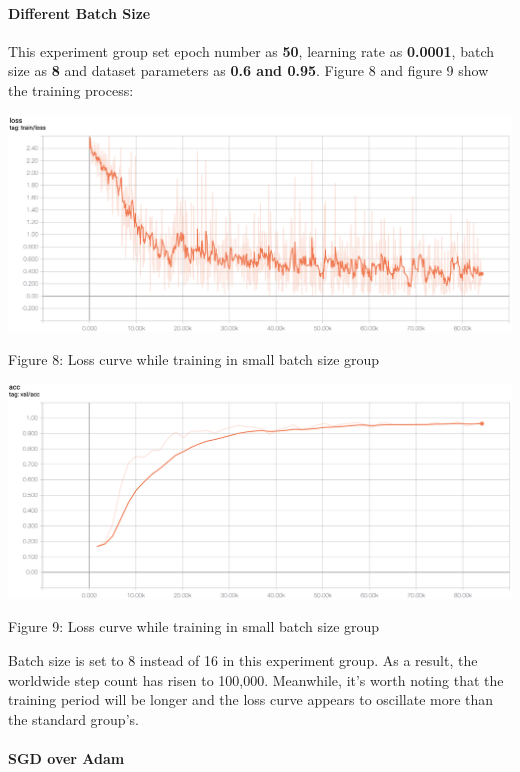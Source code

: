 \documentclass[11pt]{article}
\begin{document}
    \hypertarget{different-batch-size}{%
\paragraph{Different Batch Size}\label{different-batch-size}}

This experiment group set epoch number as \textbf{50}, learning rate as
\textbf{0.0001}, batch size as \textbf{8} and dataset parameters as
\textbf{0.6 and 0.95}. Figure 8 and figure 9 show the training process:

    \includegraphics{../pics/BS_1.png}

Figure 8: Loss curve while training in small batch size group

\includegraphics{../pics/BS_2.png}

Figure 9: Loss curve while training in small batch size group

    Batch size is set to 8 instead of 16 in this experiment group. As a
result, the worldwide step count has risen to 100,000. Meanwhile, it's
worth noting that the training period will be longer and the loss curve
appears to oscillate more than the standard group's.

    \hypertarget{sgd-over-adam}{%
\paragraph{SGD over Adam}\label{sgd-over-adam}}
\end{document}
